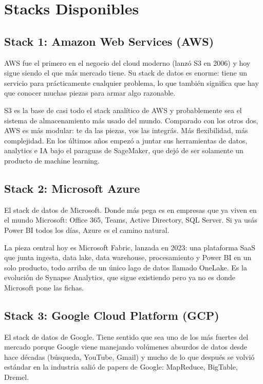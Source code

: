 \documentclass[12pt]{article}
\begin{document}
\section{Stacks Disponibles}

\subsection{Stack 1: Amazon Web Services (AWS)}
AWS fue el primero en el negocio del cloud moderno (lanzó S3 en 2006) y hoy sigue siendo el que más mercado tiene. Su stack de datos es enorme: tiene un servicio para prácticamente cualquier problema, lo que también significa que hay que conocer muchas piezas para armar algo razonable.

\bigskip

S3 es la base de casi todo el stack analítico de AWS y probablemente sea el sistema de almacenamiento más usado del mundo. Comparado con los otros dos, AWS es más modular: te da las piezas, vos las integrás. Más flexibilidad, más complejidad. En los últimos años empezó a juntar sus herramientas de datos, analytics e IA bajo el paraguas de SageMaker, que dejó de ser solamente un producto de machine learning.

\subsection{Stack 2: Microsoft Azure}
El stack de datos de Microsoft. Donde más pega es en empresas que ya viven en el mundo Microsoft: Office 365, Teams, Active Directory, SQL Server. Si ya usás Power BI todos los días, Azure es el camino natural.

\bigskip

La pieza central hoy es Microsoft Fabric, lanzada en 2023: una plataforma SaaS que junta ingesta, data lake, data warehouse, procesamiento y Power BI en un solo producto, todo arriba de un único lago de datos llamado OneLake. Es la evolución de Synapse Analytics, que sigue existiendo pero ya no es donde Microsoft pone las fichas.

\subsection{Stack 3: Google Cloud Platform (GCP)}
El stack de datos de Google. Tiene sentido que sea uno de los más fuertes del mercado porque Google viene manejando volúmenes absurdos de datos desde hace décadas (búsqueda, YouTube, Gmail) y mucho de lo que después se volvió estándar en la industria salió de papers de Google: MapReduce, BigTable, Dremel.
\end{document}
